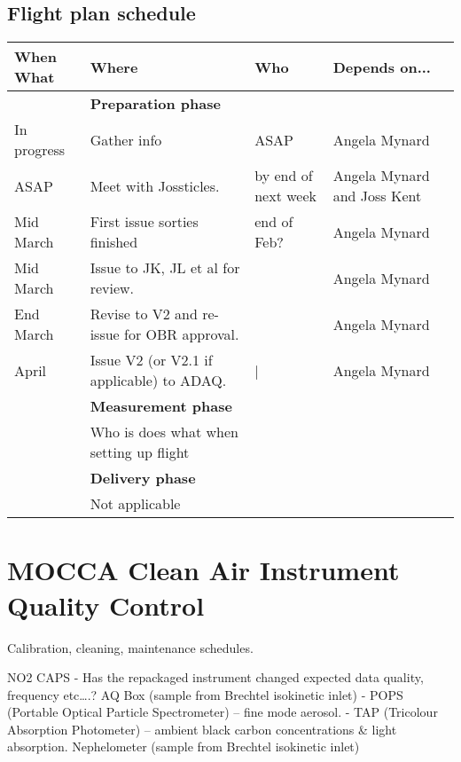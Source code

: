 \documentclass[11pt]{article} %
\begin{document}
\subsection{Flight plan schedule}

\begin{tabular}{|p{2cm}|p{5cm}|p{3cm}|p{3cm}|p{3cm}|}
\hline
\textbf{When}					\textbf{What} 								& \textbf{Where} 		& \textbf{Who}					&\textbf{Depends on...}  \\ \hline
							  	& \textbf{Preparation phase}					&						& 								&						\\ \hline
In progress						& Gather info 								& ASAP 					& Angela Mynard 				&						\\ \hline
ASAP							& Meet with Jossticles. 						& by end of next week 	& Angela Mynard and Joss Kent	&						\\ \hline 
Mid March						& First issue sorties finished 					& end of Feb? 			& Angela Mynard 				&						\\ \hline
Mid March						& Issue to JK, JL et al for review.				& 						& Angela Mynard 				& 						\\ \hline
End March						&  Revise to V2 and re-issue for OBR approval.	& 						& Angela Mynard 				& 						\\ \hline
April							& Issue V2 (or V2.1 if applicable) to ADAQ.	&|						& Angela Mynard 				&						\\ \hline
								& \textbf{Measurement phase}				&						& 								& 						\\ \hline
								& Who is does what when setting up flight		&						&								&						\\ \hline
								& \textbf{Delivery phase}						&						& 								&						\\ \hline
								& Not applicable								&						&								&						\\ \hline
\end{tabular}
\pagebreak

\section{MOCCA Clean Air Instrument Quality Control}

Calibration, cleaning, maintenance schedules.

NO2 CAPS
-	Has the repackaged instrument changed expected data quality, frequency etc….?
AQ Box (sample from Brechtel isokinetic inlet)
-	POPS (Portable Optical Particle Spectrometer) – fine mode aerosol.
-	TAP (Tricolour Absorption Photometer) – ambient black carbon concentrations & light absorption. 
Nephelometer (sample from Brechtel isokinetic inlet)
\end{document}
